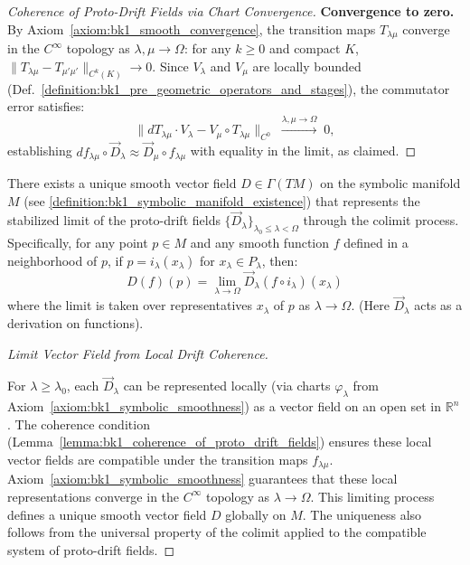 \begin{lemma}
\begin{proof}[Coherence of Proto-Drift Fields via Chart Convergence]
\textbf{Convergence to zero.}
By Axiom~\ref{axiom:bk1_smooth_convergence}, the transition maps $T_{\lambda\mu}$
converge in the $C^\infty$ topology as $\lambda, \mu \to \Omega$: for any
$k \geq 0$ and compact $K$, $\|T_{\lambda\mu} - T_{\mu'\mu'}\|_{C^k(K)} \to 0$.
Since $V_\lambda$ and $V_\mu$ are locally bounded (Def.~\ref{definition:bk1_pre_geometric_operators_and_stages}),
the commutator error satisfies:
\[
\|dT_{\lambda\mu} \cdot V_\lambda - V_\mu \circ T_{\lambda\mu}\|_{C^0}
\;\xrightarrow{\lambda,\mu \to \Omega}\; 0,
\]
establishing $df_{\lambda\mu} \circ \vec{D}_\lambda \approx \vec{D}_\mu \circ f_{\lambda\mu}$
with equality in the limit, as claimed.
\end{proof}
\end{lemma}

\begin{theorem}
\label{theorem:bk1_emergence_of_drift_field}
There exists a unique smooth vector field $D \in \Gamma(TM)$ on the symbolic manifold $M$ (see \ref{definition:bk1_symbolic_manifold_existence}) that represents the stabilized limit of the proto-drift fields $\{\vec{D}_\lambda\}_{\lambda_0 \le \lambda < \Omega}$ through the colimit process. Specifically, for any point $p \in M$ and any smooth function $f$ defined in a neighborhood of $p$, if $p = i_\lambda(x_\lambda)$ for $x_\lambda \in P_\lambda$, then:
\[
D(f)(p) = \lim_{\lambda \to \Omega} \vec{D}_\lambda(f \circ i_\lambda)(x_\lambda)
\]
where the limit is taken over representatives $x_\lambda$ of $p$ as $\lambda \to \Omega$. (Here $\vec{D}_\lambda$ acts as a derivation on functions).

\begin{proof}[Limit Vector Field from Local Drift Coherence]
\label{proof:bk1_sketch_drift_limit_vector_field}
\leavevmode

For $\lambda \ge \lambda_0$, each $\vec{D}_\lambda$ can be represented locally (via charts $\varphi_\lambda$ from Axiom~\ref{axiom:bk1_symbolic_smoothness}) as a vector field on an open set in $\mathbb{R}^n$. The coherence condition (Lemma~\ref{lemma:bk1_coherence_of_proto_drift_fields}) ensures these local vector fields are compatible under the transition maps $f_{\lambda\mu}$. Axiom~\ref{axiom:bk1_symbolic_smoothness} guarantees that these local representations converge in the $C^\infty$ topology as $\lambda \to \Omega$. This limiting process defines a unique smooth vector field $D$ globally on $M$. The uniqueness also follows from the universal property of the colimit applied to the compatible system of proto-drift fields.
\end{proof}
\end{theorem}

